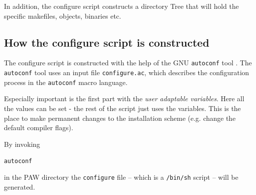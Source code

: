 \documentclass[a4paper,10pt]{report}
\newcommand{\mytt}[1]{{\tt #1}}
\begin{document}
In addition, the configure script constructs a directory Tree that will
hold the specific makefiles, objects, binaries etc.

\subsection{How the configure script is constructed}

The configure script is constructed with the help of the GNU
\mytt{autoconf} tool . The \mytt{autoconf} tool uses an input file
\mytt{configure.ac}, which describes the configuration process in the
\mytt{autoconf} macro language.

Especially important is the first part with the \emph{user adaptable
variables}. Here all the values can be set - the rest of the script just uses
the variables.  This is the place to make permanent changes to the installation
scheme (e.g. change the default compiler flags).

By invoking
\begin{center}
\mytt{autoconf}
\end{center}
in the PAW directory the \texttt{configure} file -- which is a
\texttt{/bin/sh} script -- will be generated.


\appendix
\newpage
\end{document}
